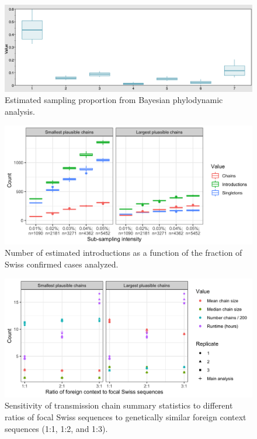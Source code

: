 \documentclass[9pt,twoside,lineno]{pnas-new}
\begin{document}
\begin{figure}
\centering
\includegraphics[width = 11.4cm]{figures/Samp_noSampUB.png}
\caption{Estimated sampling proportion from Bayesian phylodynamic analysis.}  
\label{fig:samp-prop}
\end{figure}

\begin{figure}
\centering
\includegraphics[width = 11.4cm]{figures/fig_SX_sensitivity_subsampling.png}
\caption{Number of estimated introductions as a function of the fraction of Swiss confirmed cases analyzed.}  
\label{fig:sensitivity_downsampling}
\end{figure}

\begin{figure}
\centering
\includegraphics[width = 11.4cm]{figures/fig_SX_sensitivity_context_set_size.png}
\caption{Sensitivity of transmission chain summary statistics to different ratios of focal Swiss sequences to genetically similar foreign context sequences (1:1, 1:2, and 1:3).}  
\label{fig:sensitivity_context_set_size}
\end{figure}
\end{document}
